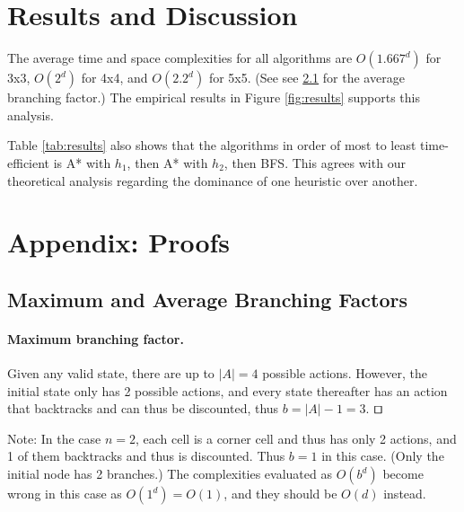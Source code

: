 \documentclass[runningheads]{llncs}
\begin{document}
\section{Results and Discussion}
The average time and space complexities for all algorithms are $O(1.667^d)$ for 3x3, $O(2^d)$ for 4x4, and $O(2.2^d)$ for 5x5. (See see \ref{subsec:branchingfactors} for the average branching factor.) The empirical results in Figure \ref{fig:results} supports this analysis.

Table \ref{tab:results} also shows that the algorithms in order of most to least time-efficient is A* with $h_1$, then A* with $h_2$, then BFS. This agrees with our theoretical analysis regarding the dominance of one heuristic over another.




\pagebreak
\appendix
\section{Appendix: Proofs}
\label{app:proofs}


\subsection{Maximum and Average Branching Factors}
\label{subsec:branchingfactors}
\paragraph{Maximum branching factor.} Given any valid state, there are up to $|A|=4$ possible actions. However, the initial state only has 2 possible actions, and every state thereafter has an action that backtracks and can thus be discounted, thus $b = |A|-1 = 3$. $\qed$

Note: In the case $n=2$, each cell is a corner cell and thus has only 2 actions, and 1 of them backtracks and thus is discounted. Thus $b = 1$ in this case. (Only the initial node has 2 branches.) The complexities evaluated as $O(b^d)$ become wrong in this case as $O(1^d) = O(1)$, and they should be $O(d)$ instead.
\end{document}
